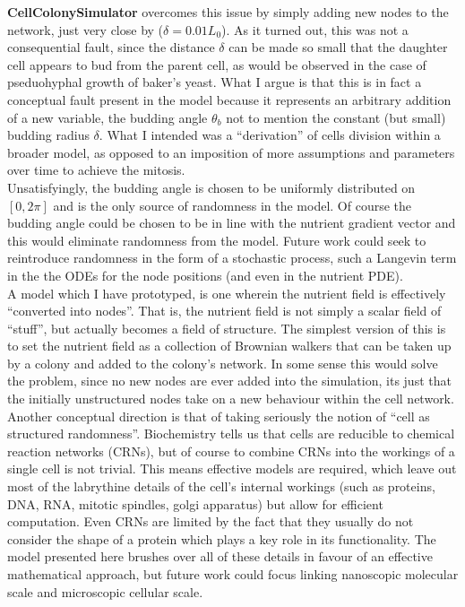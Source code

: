 \textbf{CellColonySimulator} overcomes this issue by simply 
adding new nodes to the network, just very close by ($\delta = 0.01 L_0$).
As it turned out, this was not a consequential fault,
since the distance $\delta$ can be made so small that 
the daughter cell appears to bud from the parent cell, as 
would be observed in the case of pseduohyphal growth of baker's yeast.
What I argue is that this is in fact a conceptual fault present in the model
because it represents an arbitrary addition of a new variable,
the budding angle $\theta_{b}$ not to mention the constant (but small) budding radius 
$\delta$. What I intended  
was a ``derivation'' of cells division within a broader model,
as opposed to an imposition of more assumptions and parameters
over time to achieve the mitosis.
\\

Unsatisfyingly, the budding angle is chosen to be uniformly distributed on $[0, 2 \pi]$
and is the only source of randomness in the model. Of course the budding angle
could be chosen to be in line with the nutrient gradient vector and this would 
eliminate randomness from the model. Future work could seek to 
reintroduce randomness in the form of a stochastic process, 
such a Langevin term in the the ODEs for the node positions (and even in the nutrient PDE).
\\

A model which I have prototyped, is one wherein the nutrient field is 
effectively ``converted into nodes''. That is, the nutrient field is not simply
a scalar field of ``stuff'', but actually becomes a field of structure. The simplest
version of this is to set the nutrient field as a collection of Brownian walkers that 
can be taken up by a colony and added to the colony's network. In some sense this 
would solve the problem, since no new nodes are ever added into the simulation,
its just that the initially unstructured nodes take on a new behaviour within the cell network.
\\

Another conceptual direction is that of taking seriously the notion of 
``cell as structured randomness''. Biochemistry tells us that
cells are reducible to chemical reaction networks (CRNs), but of course to combine 
CRNs into the workings of a single cell is not trivial. This means effective
models are required, which leave out most of the labrythine details of the cell's
internal workings (such as proteins, DNA, RNA, mitotic spindles, golgi apparatus) but allow
for efficient computation. Even CRNs are limited by the fact that 
they usually do not consider the shape of a protein which plays 
a key role in its functionality. The model presented here brushes
over all of these details in favour of an effective mathematical approach, 
but future work could focus linking 
nanoscopic molecular scale and microscopic cellular scale.
\\

